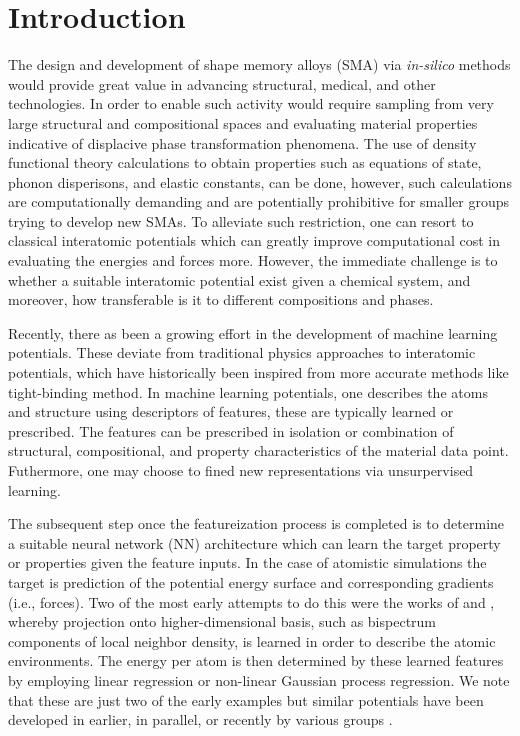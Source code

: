 \documentclass[preprint,colorlinks=true,linkcolor=black,citecolor=black]{elsarticle}
\begin{document}
\section{Introduction}
\label{sec:intro}

The design and development of shape memory alloys (SMA) via \textit{in-silico} methods would provide great value in advancing structural, medical, and other technologies. In order to enable such activity would require sampling from very large structural and compositional spaces and evaluating material properties indicative of displacive phase transformation phenomena. The use of density functional theory calculations to obtain properties such as equations of state, phonon disperisons, and elastic constants, can be done, however, such calculations are computationally demanding and are potentially prohibitive for smaller groups trying to develop new SMAs. To alleviate such restriction, one can resort to classical interatomic potentials which can greatly improve computational cost in  evaluating the energies and forces more. However, the immediate challenge is to whether a suitable interatomic potential exist given a chemical system, and moreover, how transferable is it to different compositions and phases. \par

Recently, there as been a growing effort in the development of machine learning potentials. These deviate from traditional physics approaches to interatomic potentials, which have historically been inspired from more accurate methods like tight-binding method. In machine learning potentials, one describes the atoms and structure using descriptors of features, these are typically learned or prescribed. The features can be prescribed in isolation or combination of  structural, compositional, and property characteristics of the material data point. Futhermore, one may choose to fined new representations via unsurpervised learning. \par

The subsequent step once the featureization process is completed is to determine a suitable neural network (NN) architecture which can learn the target property or properties given the feature inputs. In the case of atomistic simulations the target is prediction of the potential energy surface and corresponding gradients (i.e., forces). Two of the most early attempts to do this were the works of \citet{Bartok2010} and \citet{Thompson2015}, whereby projection onto higher-dimensional basis, such as bispectrum components of local neighbor density, is learned in order to describe the atomic environments. The energy per atom is then determined by these learned features by employing linear regression or non-linear Gaussian process regression. We note that these are just two of the early examples but similar potentials have been developed in earlier, in parallel, or recently by various groups \cite{Behler2007,Wang2018,Deringer2019,Lee2019}. \par
\end{document}
